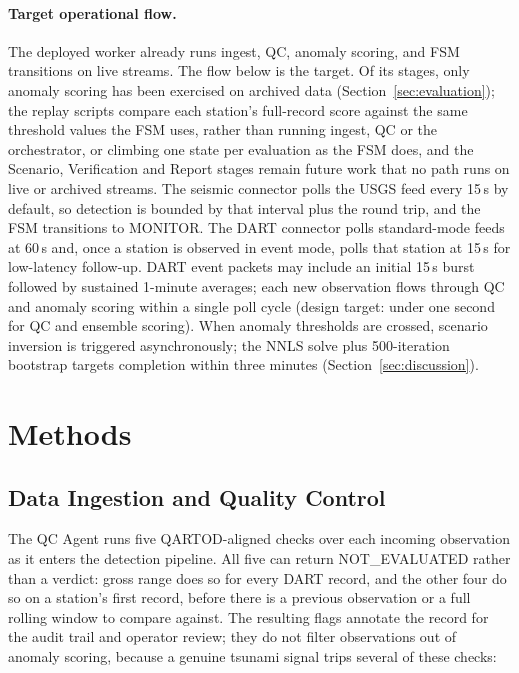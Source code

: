 \documentclass{article}
\begin{document}
\paragraph{Target operational flow.}
The deployed worker already runs ingest, QC, anomaly scoring, and FSM
transitions on live streams.  The flow below is the target.  Of its
stages, only anomaly scoring has been exercised on archived data
(Section~\ref{sec:evaluation}); the replay scripts compare each
station's full-record score against the same threshold values the FSM
uses, rather than running ingest, QC or the orchestrator, or climbing
one state per evaluation as the FSM does, and the Scenario, Verification and
Report stages remain future work that no path runs on live or archived
streams.
The seismic connector polls the USGS feed every 15\,s by default, so
detection is bounded by that interval plus the round trip, and the FSM
transitions to MONITOR. The DART connector polls standard-mode feeds
at 60\,s and, once a station is observed in event mode, polls that
station at 15\,s for low-latency follow-up. DART event packets may
include an initial 15\,s burst followed by sustained 1-minute averages;
each new observation flows through QC and anomaly scoring within a single
poll cycle (design target: under one second for QC and ensemble
scoring). When anomaly thresholds are crossed, scenario inversion
is triggered asynchronously; the NNLS solve plus 500-iteration
bootstrap targets completion within three minutes
(Section~\ref{sec:discussion}).


\section{Methods}
\label{sec:methods}

\subsection{Data Ingestion and Quality Control}
\label{sec:qc}

The QC Agent runs five QARTOD-aligned checks over each incoming
observation as it enters the detection pipeline.  All five can return
NOT\_EVALUATED rather than a verdict: gross range does so for every
DART record, and the other four do so on a station's first record,
before there is a previous observation or a full rolling window to
compare against. The resulting flags
annotate the record for the audit trail and operator review; they do
not filter observations out of anomaly scoring, because a genuine
tsunami signal trips several of these checks:
\end{document}
